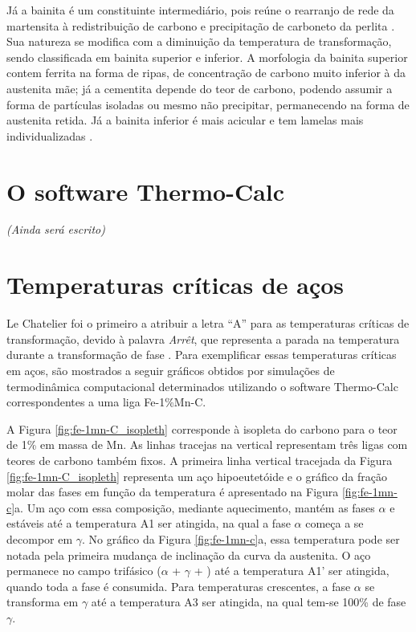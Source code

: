 \documentclass[brazil,tf,epusp]{usp}  %
\begin{document}
Já a bainita é um constituinte intermediário, pois reúne o rearranjo de rede da martensita à redistribuição de carbono e precipitação de carboneto da perlita \cite{Totten2006}. Sua natureza se modifica com a diminuição da temperatura de transformação, sendo classificada em bainita superior e inferior. A morfologia da bainita superior contem ferrita na forma de ripas, de concentração de carbono muito inferior à da austenita mãe; já a cementita depende do teor de carbono, podendo assumir a forma de partículas isoladas ou mesmo não precipitar, permanecendo na forma de austenita retida. Já a bainita inferior é mais acicular e tem lamelas mais individualizadas \cite{Honeycombe1982}.

\section{O software Thermo-Calc\textregistered{}}
\textit{(Ainda será escrito)}

\section{Temperaturas cr\'iticas de aços}

Le Chatelier foi o primeiro a atribuir a letra ``A'' para as temperaturas críticas de transformação, devido à palavra \textit{Arrêt}, que representa a parada na temperatura durante a transformação de fase \cite{Silva2010}. Para exemplificar essas temperaturas críticas em aços, são mostrados a seguir gráficos obtidos por simulações de termodinâmica computacional determinados utilizando o software Thermo-Calc\textregistered{} correspondentes a uma liga Fe-1\%Mn-C.

A Figura \ref{fig:fe-1mn-C_isopleth} corresponde à isopleta do carbono para o teor de 1\% em massa de Mn. As linhas tracejas na vertical representam três ligas com teores de carbono também fixos. A primeira linha vertical tracejada da Figura \ref{fig:fe-1mn-C_isopleth} representa um aço hipoeutetóide e o gráfico da fração molar das fases em função da temperatura é apresentado na Figura \ref{fig:fe-1mn-c}a. Um aço com essa composição, mediante aquecimento, mantém as fases $\alpha$ e  estáveis até a temperatura A1 ser atingida, na qual a fase $\alpha$ começa a se decompor em $\gamma$. No gráfico da Figura \ref{fig:fe-1mn-c}a, essa temperatura pode ser notada pela primeira mudança de inclinação da curva da austenita. O aço permanece no campo trifásico ($\alpha$ + $\gamma$ + ) até a temperatura A1' ser atingida, quando toda a fase  é consumida. Para temperaturas crescentes, a fase $\alpha$ se transforma em $\gamma$ até a temperatura A3 ser atingida, na qual tem-se 100\% de fase $\gamma$.
\end{document}
